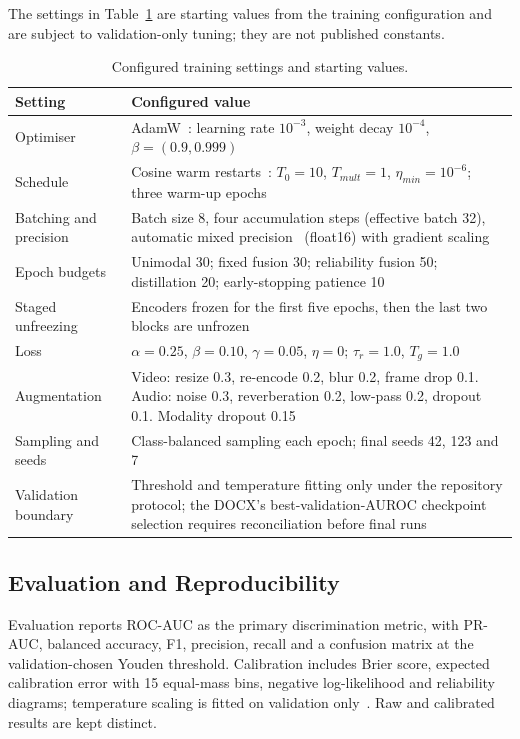 \documentclass[conference]{IEEEtran}
\begin{document}
The settings in Table~\ref{tab:trainconfig} are starting values from the training configuration and are subject to validation-only tuning; they are not published constants.

\begin{table}[t]
\caption{Configured training settings and starting values.}
\label{tab:trainconfig}
\centering
\scriptsize
\setlength{\tabcolsep}{4pt}
\renewcommand{\arraystretch}{1.08}
\begin{tabular}{>{\raggedright\arraybackslash}p{}>{\raggedright\arraybackslash}p{}}
\toprule
\textbf{Setting} & \textbf{Configured value} \\
\midrule
Optimiser & AdamW~\cite{loschilov2019}: learning rate $10^{-3}$, weight decay $10^{-4}$, $\beta=(0.9,0.999)$ \\
Schedule & Cosine warm restarts~\cite{loschilov2017}: $T_0=10$, $T_{mult}=1$, $\eta_{min}=10^{-6}$; three warm-up epochs \\
Batching and precision & Batch size 8, four accumulation steps (effective batch 32), automatic mixed precision~\cite{micikevicius2018} (float16) with gradient scaling \\
Epoch budgets & Unimodal 30; fixed fusion 30; reliability fusion 50; distillation 20; early-stopping patience 10 \\
Staged unfreezing & Encoders frozen for the first five epochs, then the last two blocks are unfrozen \\
Loss & $\alpha=0.25$, $\beta=0.10$, $\gamma=0.05$, $\eta=0$; $\tau_r=1.0$, $T_g=1.0$ \\
Augmentation & Video: resize 0.3, re-encode 0.2, blur 0.2, frame drop 0.1. Audio: noise 0.3, reverberation 0.2, low-pass 0.2, dropout 0.1. Modality dropout 0.15 \\
Sampling and seeds & Class-balanced sampling each epoch; final seeds 42, 123 and 7 \\
Validation boundary & Threshold and temperature fitting only under the repository protocol; the DOCX's best-validation-AUROC checkpoint selection requires reconciliation before final runs \\
\bottomrule
\end{tabular}
\end{table}

\subsection{Evaluation and Reproducibility}
Evaluation reports ROC-AUC as the primary discrimination metric, with PR-AUC, balanced accuracy, F1, precision, recall and a confusion matrix at the validation-chosen Youden threshold. Calibration includes Brier score, expected calibration error with 15 equal-mass bins, negative log-likelihood and reliability diagrams; temperature scaling is fitted on validation only~\cite{guo2017}. Raw and calibrated results are kept distinct.
\end{document}
